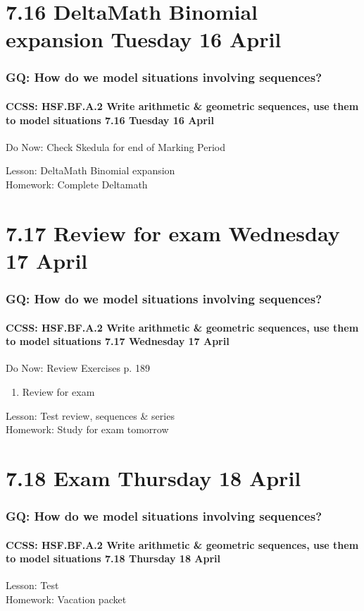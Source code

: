\documentclass{beamer}
\begin{document}
\section{7.16 DeltaMath Binomial expansion Tuesday 16 April}
  \frame
  {
    \frametitle{GQ: How do we model situations involving sequences?}
    \framesubtitle{CCSS: HSF.BF.A.2 Write arithmetic \& geometric sequences, use them to model situations \hfill \alert{7.16 Tuesday 16 April}}

    \begin{block}{Do Now: Check Skedula for end of Marking Period}
    \end{block}
    Lesson: DeltaMath Binomial expansion\\[1cm]
    Homework: Complete Deltamath
  }

\section{7.17 Review for exam Wednesday 17 April}
  \frame
  {
    \frametitle{GQ: How do we model situations involving sequences?}
    \framesubtitle{CCSS: HSF.BF.A.2 Write arithmetic \& geometric sequences, use them to model situations \hfill \alert{7.17 Wednesday 17 April}}

    \begin{block}{Do Now: Review Exercises p. 189}
      \begin{enumerate}
        \item Review for exam
    \end{enumerate}
    \end{block}
    Lesson: Test review, sequences \& series\\[1cm]
    Homework: Study for \alert{exam tomorrow}
  }

\section{7.18 Exam Thursday 18 April}
  \frame
  {
    \frametitle{GQ: How do we model situations involving sequences?}
    \framesubtitle{CCSS: HSF.BF.A.2 Write arithmetic \& geometric sequences, use them to model situations \hfill \alert{7.18 Thursday 18 April}}

    Lesson: Test \\[1cm]
    Homework: Vacation packet
  }
\end{document}
